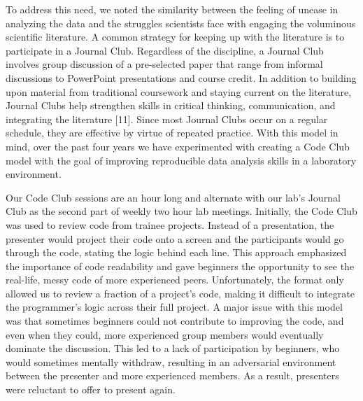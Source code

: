 \documentclass[
  11pt,
]{article}
\begin{document}
To address this need, we noted the similarity between the feeling of
unease in analyzing the data and the struggles scientists face with
engaging the voluminous scientific literature. A common strategy for
keeping up with the literature is to participate in a Journal Club.
Regardless of the discipline, a Journal Club involves group discussion
of a pre-selected paper that range from informal discussions to
PowerPoint presentations and course credit. In addition to building upon
material from traditional coursework and staying current on the
literature, Journal Clubs help strengthen skills in critical thinking,
communication, and integrating the literature {[}11{]}. Since most
Journal Clubs occur on a regular schedule, they are effective by virtue
of repeated practice. With this model in mind, over the past four years
we have experimented with creating a Code Club model with the goal of
improving reproducible data analysis skills in a laboratory environment.

Our Code Club sessions are an hour long and alternate with our lab's
Journal Club as the second part of weekly two hour lab meetings.
Initially, the Code Club was used to review code from trainee projects.
Instead of a presentation, the presenter would project their code onto a
screen and the participants would go through the code, stating the logic
behind each line. This approach emphasized the importance of code
readability and gave beginners the opportunity to see the real-life,
messy code of more experienced peers. Unfortunately, the format only
allowed us to review a fraction of a project's code, making it difficult
to integrate the programmer's logic across their full project. A major
issue with this model was that sometimes beginners could not contribute
to improving the code, and even when they could, more experienced group
members would eventually dominate the discussion. This led to a lack of
participation by beginners, who would sometimes mentally withdraw,
resulting in an adversarial environment between the presenter and more
experienced members. As a result, presenters were reluctant to offer to
present again.
\end{document}
